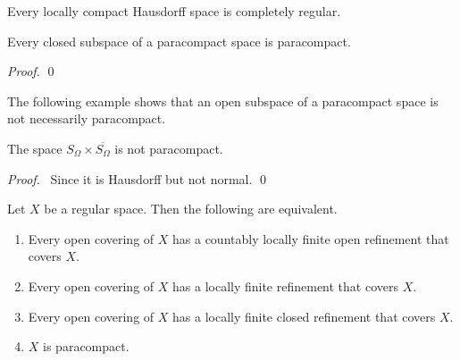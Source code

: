\begin{corollary}
    Every locally compact Hausdorff space is completely regular.
\end{corollary}

\begin{theorem}
    Every closed subspace of a paracompact space is paracompact.
\end{theorem}

\begin{proof}
    \pf
    \qed
\end{proof}

The following example shows that an open subspace of a paracompact space is not necessarily paracompact.

\begin{proposition}
    The space $S_\Omega \times \overline{S_\Omega}$ is not paracompact.
\end{proposition}

\begin{proof}
    \pf\ Since it is Hausdorff but not normal. \qed
\end{proof}

\begin{lemma}
    \label{lemma:paracompactness}
    Let $X$ be a regular space. Then the following are equivalent.
    \begin{enumerate}
        \item Every open covering of $X$ has a countably locally finite open refinement that covers $X$.
        \item Every open covering of $X$ has a locally finite refinement that covers $X$.
        \item Every open covering of $X$ has a locally finite closed refinement that covers $X$.
        \item $X$ is paracompact.
    \end{enumerate}
\end{lemma}


